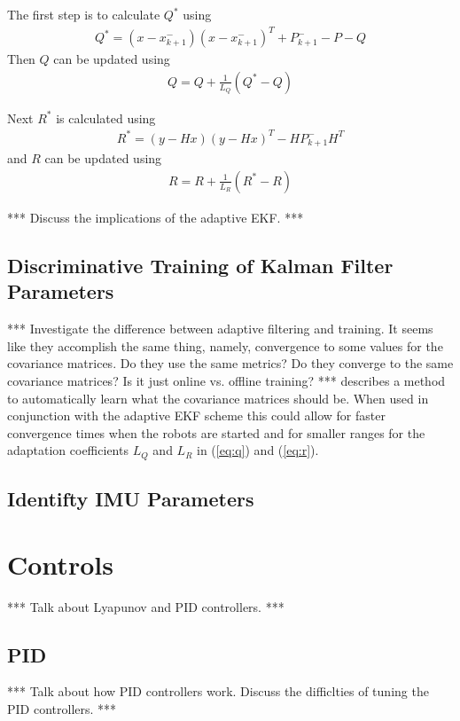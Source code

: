 \documentclass[12pt]{report}
\begin{document}
\begin{spacing}{1.1}
The first step is to calculate $Q^\ast$ using
\begin{align}
\label{eq:qstar}
Q^\ast = \left(x-x_{k+1}^-\right)\left(x-x_{k+1}^-\right)^T + P_{k+1}^- - P - Q
\end{align}
Then $Q$ can be updated using
\begin{align}
\label{eq:q}
Q = Q + \frac{1}{L_Q}\left(Q^\ast-Q\right)
\end{align}

Next $R^\ast$ is calculated using
\begin{align}
\label{eq:rstar}
R^\ast = \left(y-Hx\right)\left(y-Hx\right)^T - HP_{k+1}^-H^T
\end{align}
and $R$ can be updated using
\begin{align}
\label{eq:r}
R = R + \frac{1}{L_R}\left(R^\ast-R\right)
\end{align}

*** Discuss the implications of the adaptive EKF. ***

\section{Discriminative Training of Kalman Filter Parameters}
*** Investigate the difference between adaptive filtering and training. It seems like they accomplish the same thing, namely, convergence to some values for the covariance matrices. Do they use the same metrics? Do they converge to the same covariance matrices? Is it just online vs. offline training? *** \cite{Abbeel-RSS-05} describes a method to automatically learn what the covariance matrices should be. When used in conjunction with the adaptive EKF scheme this could allow for faster convergence times when the robots are started and for smaller ranges for the adaptation coefficients $L_Q$ and $L_R$ in (\ref{eq:q}) and (\ref{eq:r}).

\section{Identifty IMU Parameters}

\clearpage

\chapter{Controls}
\label{sec:controls}
*** Talk about Lyapunov and PID controllers. ***

\section{PID}
*** Talk about how PID controllers work. Discuss the difficlties of tuning the PID controllers. ***


\end{spacing}
\end{document}
